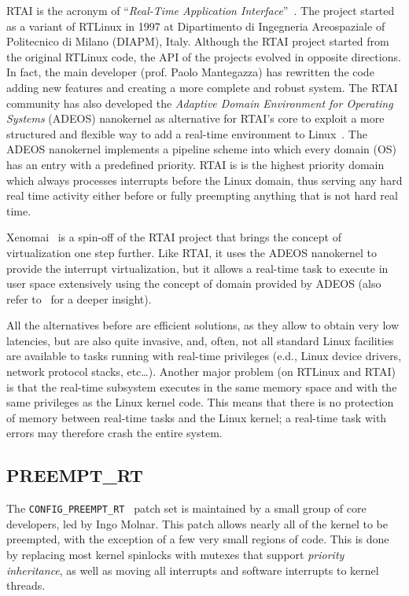RTAI is the acronym of ``\emph{Real-Time Application
  Interface}''~\cite{RTAI}.  The project started as a variant of
RTLinux in 1997 at Dipartimento di Ingegneria Areospaziale of
Politecnico di Milano (DIAPM), Italy. Although the RTAI project
started from the original RTLinux code, the API of the projects
evolved in opposite directions. In fact, the main developer
(prof. Paolo Mantegazza) has rewritten the code adding new features
and creating a more complete and robust system. The RTAI community has
also developed the \emph{Adaptive Domain Environment for Operating
  Systems} (ADEOS) nanokernel as alternative for RTAI's core to
exploit a more structured and flexible way to add a real-time
environment to Linux~\cite{mantegazza03}.  The ADEOS nanokernel
implements a pipeline scheme into which every domain (OS) has an entry
with a predefined priority.  RTAI is is the highest priority domain
which always processes interrupts before the Linux domain, thus
serving any hard real time activity either before or fully preempting
anything that is not hard real time.

Xenomai~\cite{gerum02} is a spin-off of the RTAI project that brings
the concept of virtualization one step further. Like RTAI, it uses the
ADEOS nanokernel to provide the interrupt virtualization, but it
allows a real-time task to execute in user space extensively using the
concept of domain provided by ADEOS (also refer
to~\cite{LipariScordino2006} for a deeper insight).

All the alternatives before are efficient solutions, as they allow to
obtain very low latencies, but are also quite invasive, and, often,
not all standard Linux facilities are available to tasks running with
real-time privileges (e.d., Linux device drivers, network protocol
stacks, etc\dots). Another major problem (on RTLinux and RTAI) is that
the real-time subsystem executes in the same memory space and with the
same privileges as the Linux kernel code. This means that there is no
protection of memory between real-time tasks and the Linux kernel; a
real-time task with errors may therefore crash the entire system.
\subsection{PREEMPT\_RT\label{sec:StateArt_PREEMPT}}
The \texttt{CONFIG\_PREEMPT\_RT}~\cite{PREEMPT_RT} patch set is maintained by a
small group of core developers, led by Ingo Molnar.
This patch allows nearly all of the kernel to be preempted, with the exception
of a few very small regions of code. This is done by replacing most kernel
spinlocks with mutexes that support \emph{priority inheritance}, as well as
moving all interrupts and software interrupts to kernel threads.

